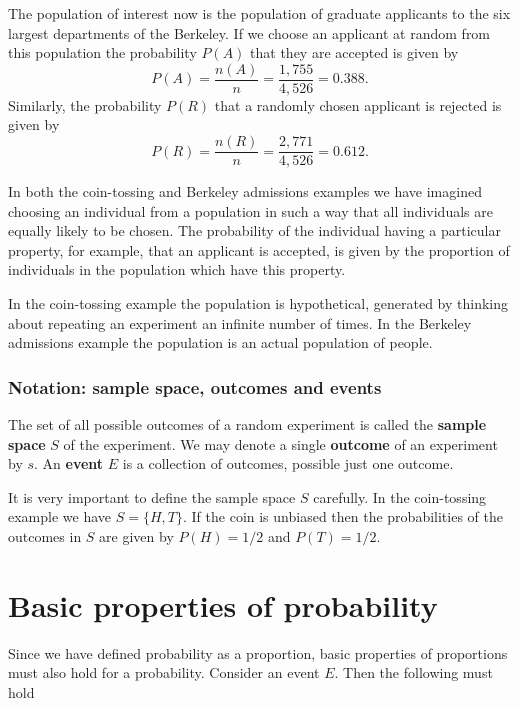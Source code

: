 \documentclass[
  11pt,
  british,
  openany, a4paper]{book}
\begin{document}
The population of interest now is the population of graduate applicants to the six largest departments of the Berkeley. If we choose an applicant at random from this population the probability \(P(A)\) that they are accepted is given by
\[ P(A) = \frac{n(A)}{n} = \frac{1,755}{4,526} = 0.388.\]
Similarly, the probability \(P(R)\) that a randomly chosen applicant is rejected is given by
\[ P(R) = \frac{n(R)}{n} = \frac{2,771}{4,526} = 0.612.\]

In both the coin-tossing and Berkeley admissions examples we have imagined choosing an individual from a population in such a way that all individuals are equally likely to be chosen. The probability of the individual having a particular property, for example, that an applicant is accepted, is given by the proportion of individuals in the population which have this property.

In the coin-tossing example the population is hypothetical, generated by thinking about repeating an experiment an infinite number of times. In the Berkeley admissions example the population is an actual population of people.

\hypertarget{notation-sample-space-outcomes-and-events}{%
\subsubsection*{Notation: sample space, outcomes and events}\label{notation-sample-space-outcomes-and-events}}

The set of all possible outcomes of a random experiment is called the \textbf{sample space} \(S\) of the experiment. We may denote a single \textbf{outcome} of an experiment by \(s\). An \textbf{event} \(E\) is a collection of outcomes, possible just one outcome.

It is very important to define the sample space \(S\) carefully. In the coin-tossing example we have \(S=\{H,T\}\). If the coin is unbiased then the probabilities of the outcomes in \(S\) are given by \(P(H)=1/2\) and \(P(T)=1/2\).

\hypertarget{basic-properties-of-probability}{%
\section{Basic properties of probability}\label{basic-properties-of-probability}}

Since we have defined probability as a proportion, basic properties of proportions must also hold for a probability. Consider an event \(E\). Then the following must hold
\end{document}
